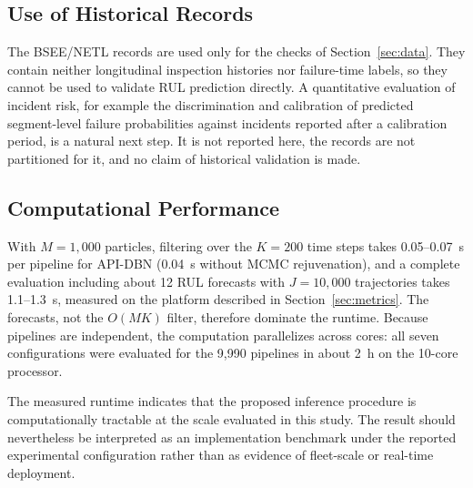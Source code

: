 \documentclass[journal]{IEEEtran}
\begin{document}

\subsection{Use of Historical Records}
\label{sec:case_results}

The BSEE/NETL records are used only for the checks of
Section~\ref{sec:data}. They contain neither longitudinal inspection
histories nor failure-time labels, so they cannot be used to validate
RUL prediction directly. A quantitative evaluation of incident risk,
for example the discrimination and calibration of predicted
segment-level failure probabilities against incidents reported after a
calibration period, is a natural next step. It is not reported here,
the records are not partitioned for it, and no claim of historical
validation is made.





\subsection{Computational Performance}
\label{sec:complexity}

With $M=1{,}000$ particles, filtering over the $K=200$ time steps takes
0.05--0.07~s per pipeline for API-DBN (0.04~s without MCMC
rejuvenation), and a complete evaluation including about 12 RUL
forecasts with $J=10{,}000$ trajectories takes 1.1--1.3~s, measured on
the platform described in Section~\ref{sec:metrics}. The forecasts,
not the $O(MK)$ filter, therefore dominate the runtime. Because
pipelines are independent, the computation parallelizes across cores:
all seven configurations were evaluated for the 9{,}990 pipelines in
about 2~h on the 10-core processor.

The measured runtime indicates that the proposed inference procedure is
computationally tractable at the scale evaluated in this study. The
result should nevertheless be interpreted as an implementation
benchmark under the reported experimental configuration rather than as
evidence of fleet-scale or real-time deployment.


\end{document}
